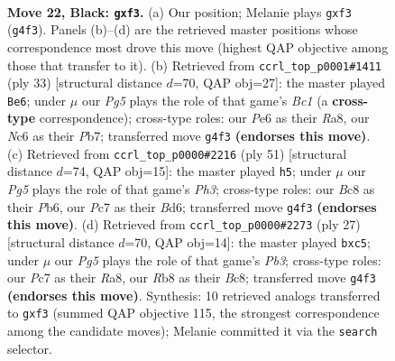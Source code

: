 \documentclass[11pt]{article}
\begin{document}
\clearpage

\begin{figure}[p]\centering
\begin{subfigure}{0.46\textwidth}\centering
\resizebox{\linewidth}{!}{%
\newchessgame
\chessboard[
  setfen={1rb2r2/p1pp1pk1/2n1p3/2R4p/6p1/5NP1/PP1BPP1P/4KB1R b - - 0 22},
  showmover=false,
  pgfstyle=straightmove, color=movearrow, markmove={g4-f3}
]}
\caption{}
\end{subfigure}\hfill
\begin{subfigure}{0.46\textwidth}\centering
\resizebox{\linewidth}{!}{%
\newchessgame
\chessboard[
  setfen={r1b1r1k1/1p3pp1/pRn2n1p/4p3/2P5/P4NP1/4PPBP/2BR2K1 b - - 0 17},
  showmover=false,
  pgfstyle=straightmove, color=movearrow, markmove={c8-e6}
]}
\caption{}
\end{subfigure}
\\[4pt]
\begin{subfigure}{0.46\textwidth}\centering
\resizebox{\linewidth}{!}{%
\newchessgame
\chessboard[
  setfen={2rr4/5k2/1p1bpp1p/p2n2p1/P7/2PR1NPP/1P2KP2/R3B3 b - - 3 26},
  showmover=false,
  pgfstyle=straightmove, color=movearrow, markmove={h6-h5}
]}
\caption{}
\end{subfigure}\hfill
\begin{subfigure}{0.46\textwidth}\centering
\resizebox{\linewidth}{!}{%
\newchessgame
\chessboard[
  setfen={r1br2k1/p3pp1p/1pn3pb/2P5/4P3/P1B2N2/1P2KPPP/3R1B1R b - - 4 14},
  showmover=false,
  pgfstyle=straightmove, color=movearrow, markmove={b6-c5}
]}
\caption{}
\end{subfigure}
\caption{\textbf{Move 22, Black: \texttt{gxf3}.} (a) Our position; Melanie plays \texttt{gxf3} (\texttt{g4f3}). Panels (b)--(d) are the retrieved master positions whose correspondence most drove this move (highest QAP objective among those that transfer to it). (b) Retrieved from \texttt{ccrl\_top\_p0001\#1411} (ply 33) [structural distance $d$=70, QAP obj=27]: the master played \texttt{Be6}; under $\mu$ our \emph{Pg5} plays the role of that game's \emph{Bc1} (a \textbf{cross-type} correspondence); cross-type roles: our \emph{P}e6 as their \emph{R}a8, our \emph{N}c6 as their \emph{P}b7; transferred move \texttt{g4f3} \textbf{(endorses this move)}. (c) Retrieved from \texttt{ccrl\_top\_p0000\#2216} (ply 51) [structural distance $d$=74, QAP obj=15]: the master played \texttt{h5}; under $\mu$ our \emph{Pg5} plays the role of that game's \emph{Ph3}; cross-type roles: our \emph{B}c8 as their \emph{P}b6, our \emph{P}c7 as their \emph{B}d6; transferred move \texttt{g4f3} \textbf{(endorses this move)}. (d) Retrieved from \texttt{ccrl\_top\_p0000\#2273} (ply 27) [structural distance $d$=70, QAP obj=14]: the master played \texttt{bxc5}; under $\mu$ our \emph{Pg5} plays the role of that game's \emph{Pb3}; cross-type roles: our \emph{P}c7 as their \emph{R}a8, our \emph{R}b8 as their \emph{B}c8; transferred move \texttt{g4f3} \textbf{(endorses this move)}. Synthesis: 10 retrieved analogs transferred to \texttt{gxf3} (summed QAP objective 115, the strongest correspondence among the candidate moves); Melanie committed it via the \texttt{search} selector.}
\label{fig:thought-m43}
\end{figure}
\end{document}
